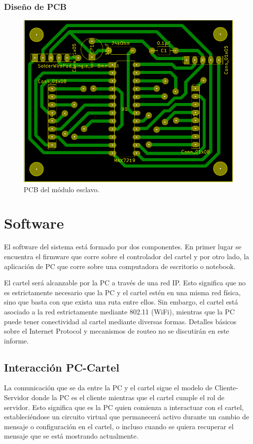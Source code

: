 \subsubsection{Diseño de PCB}
\begin{figure}[ht!]
	\centering
	\includegraphics[width=\linewidth]{imagenes/pcb-slave.pdf}
	\caption{PCB del módulo esclavo.}
	\label{fig:pcb-slave}
\end{figure}

\clearpage
\section{Software}\label{sec:sw}
El software del sistema está formado por dos componentes. En primer lugar se encuentra el firmware que corre sobre el controlador del cartel y por otro lado, la aplicación de PC que corre sobre una computadora de escritorio o notebook.

El cartel será alcanzable por la PC a través de una red IP. Esto significa que no es estrictamente necesario que la PC y el cartel estén en una misma red física, sino que basta con que exista una ruta entre ellos. Sin embargo, el cartel está asociado a la red estrictamente mediante 802.11 (WiFi), mientras que la PC puede tener conectividad al cartel mediante diversas formas. Detalles básicos sobre el Internet Protocol y mecanismos de routeo no se discutirán en este informe.

\subsection{Interacción PC-Cartel}
La comunicación que se da entre la PC y el cartel sigue el modelo de Cliente-Servidor donde la PC es el cliente mientras que el cartel cumple el rol de servidor. Esto significa que es la PC quien comienza a interactuar con el cartel, estableciéndose un circuito virtual que permanecerá activo durante un cambio de mensaje o configuración en el cartel, o incluso cuando se quiera recuperar el mensaje que se está mostrando actualmente.

